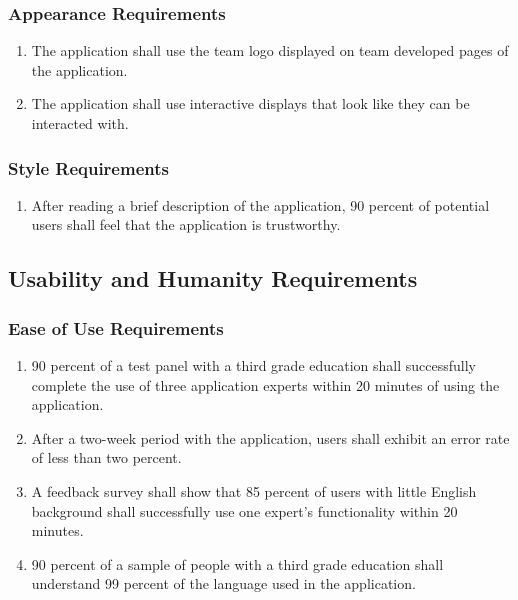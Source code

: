 \documentclass[titlepage]{article}
\begin{document}
\subsubsection{Appearance Requirements}
\label{ssub:appearance_requirements}
\begin{enumerate}[{LF}1. ]
	\item The application shall use the team logo displayed on team developed pages of the application. 
	\item The application shall use interactive displays that look like they can be interacted with. 
\end{enumerate}

\subsubsection{Style Requirements}
\label{ssub:style_requirements}
\begin{enumerate}[{LF}1. ]
	\item After reading a brief description of the application, 90 percent of potential users shall feel that the application is trustworthy.
	
	
\end{enumerate}


\subsection{Usability and Humanity Requirements}
\label{sub:usability_and_humanity_requirements}

\subsubsection{Ease of Use Requirements}
\label{ssub:ease_of_use_requirements}
\begin{enumerate}[{UH}1. ]
	\item 90 percent of a test panel with a third grade education shall successfully complete the use of three application experts within 20 minutes of using the application. 
	
	\item After a two-week period with the application, users shall exhibit an error rate of less than two percent.
	
	\item A feedback survey shall show that 85 percent of users with little English background shall successfully use one expert's functionality within 20 minutes. 
	
	\item 90 percent of a sample of people with a third grade education shall understand 99 percent of the language used in the application.      
	
	
\end{enumerate}
\end{document}
